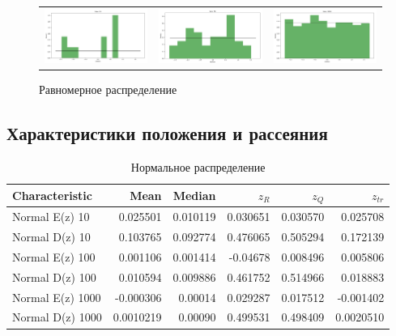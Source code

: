 	\begin{figure}[H]
		\centering
		\begin{tabular}{ccc}
			\includegraphics[width=55mm, height =0.25\textheight]{pics/u10.jpg}
			&
			\includegraphics[width=55mm, height =0.25\textheight]{pics/u50.jpg}
			&
			\includegraphics[width=55mm, height =0.25\textheight]{pics/u1000.jpg}
		\end{tabular}
		\caption{Равномерное распределение}
		\label{fig:uniform}
	\end{figure}

\subsection{Характеристики положения и рассеяния}
	\begin{table}[H]
		\centering
		\begin{tabular}[t]{lrrrrr}
			\hline
			Characteristic   &      Mean &    Median &       $z_R$ &      $z_Q$ &      $z_{tr}$ \\
			\hline
			Normal E(z) 10   &  0.025501 &  0.010119 &  0.030651 & 0.030570 &  0.025708 \\
			Normal D(z) 10   &  0.103765 &  0.092774 &  0.476065 & 0.505294 &  0.172139 \\
			Normal E(z) 100  & 0.001106 & 0.001414  &  -0.04678 & 0.008496 & 0.005806 \\
			Normal D(z) 100  &  0.010594 &  0.009886  &  0.461752 & 0.514966 &  0.018883 \\
			Normal E(z) 1000 & -0.000306 & 0.00014  & 0.029287  & 0.017512 & -0.001402 \\
			Normal D(z) 1000 &  0.0010219 &  0.00090 &  0.499531  & 0.498409 &  0.0020510 \\
			\hline
		\end{tabular}
		\caption{Нормальное распределение}
		\label{tab:normal}
	\end{table}

